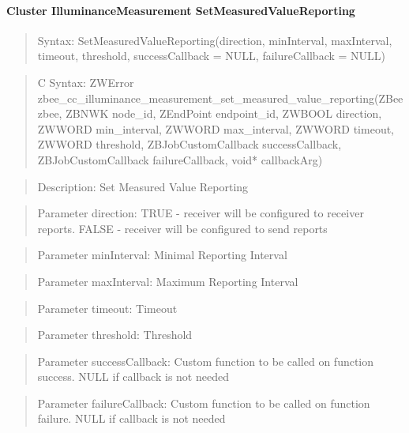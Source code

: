 \paragraph{Cluster IlluminanceMeasurement SetMeasuredValueReporting}
\begin{quote}Syntax: SetMeasuredValueReporting(direction, minInterval, maxInterval, timeout, threshold, successCallback = NULL, failureCallback = NULL)\end{quote}
\begin{quote}C Syntax: ZWError zbee\_cc\_illuminance\_measurement\_set\_measured\_value\_reporting(ZBee zbee, ZBNWK node\_id, ZEndPoint endpoint\_id, ZWBOOL direction, ZWWORD min\_interval, ZWWORD max\_interval, ZWWORD timeout, ZWWORD threshold, ZBJobCustomCallback successCallback, ZBJobCustomCallback failureCallback, void* callbackArg)\end{quote}
\begin{quote}Description: Set Measured Value Reporting\end{quote}
\begin{quote}Parameter direction: TRUE  - receiver will be configured to receiver reports. FALSE - receiver will be configured to send reports\end{quote}
\begin{quote}Parameter minInterval: Minimal Reporting Interval\end{quote}
\begin{quote}Parameter maxInterval: Maximum Reporting Interval\end{quote}
\begin{quote}Parameter timeout: Timeout\end{quote}
\begin{quote}Parameter threshold: Threshold\end{quote}
\begin{quote}Parameter successCallback: Custom function to be called on function success. NULL if callback is not needed\end{quote}
\begin{quote}Parameter failureCallback: Custom function to be called on function failure. NULL if callback is not needed\end{quote}


